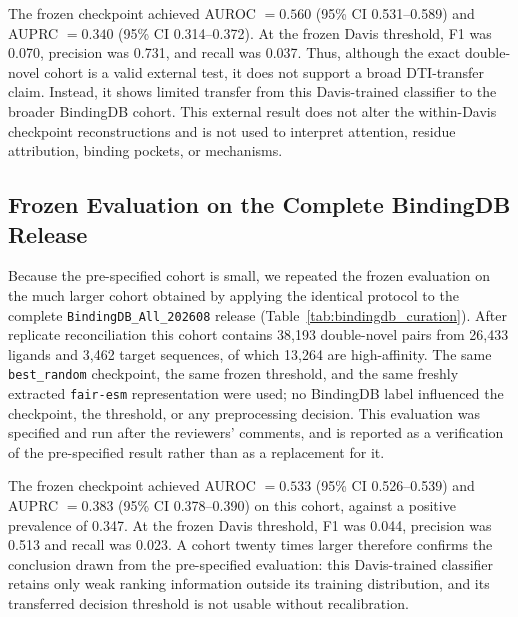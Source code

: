 \documentclass[fleqn,10pt]{wlscirep}
\begin{document}
The frozen checkpoint achieved AUROC $=0.560$ (95\% CI 0.531--0.589) and
AUPRC $=0.340$ (95\% CI 0.314--0.372).  At the frozen Davis threshold, F1 was
0.070, precision was 0.731, and recall was 0.037.  Thus, although the exact
double-novel cohort is a valid external test, it does not support a broad DTI-transfer claim.
Instead, it shows limited transfer from this
Davis-trained classifier to the broader BindingDB cohort.  This external result
does not alter the within-Davis checkpoint reconstructions and is not used to
interpret attention, residue attribution, binding pockets, or mechanisms.

\subsection{Frozen Evaluation on the Complete BindingDB Release}
\label{sec:bindingdb_full}

Because the pre-specified cohort is small, we repeated the frozen evaluation on
the much larger cohort obtained by applying the identical protocol to the
complete \texttt{BindingDB\_All\_202608} release
(Table~\ref{tab:bindingdb_curation}).  After replicate reconciliation this
cohort contains 38{,}193 double-novel pairs from 26{,}433 ligands and 3{,}462
target sequences, of which 13{,}264 are high-affinity.  The same
\texttt{best\_random} checkpoint, the same frozen threshold, and the same
freshly extracted \texttt{fair-esm} representation were used; no BindingDB label
influenced the checkpoint, the threshold, or any preprocessing decision.  This
evaluation was specified and run after the reviewers' comments, and is reported
as a verification of the pre-specified result rather than as a replacement
for it.

The frozen checkpoint achieved AUROC $=0.533$ (95\% CI 0.526--0.539) and AUPRC $=0.383$ (95\% CI 0.378--0.390) on this cohort, against a positive prevalence of 0.347.  At the frozen Davis threshold, F1 was 0.044, precision was 0.513 and recall was 0.023.  A cohort twenty times larger therefore confirms the conclusion drawn from the pre-specified evaluation: this Davis-trained classifier retains only weak ranking information outside its training distribution, and its transferred decision threshold is not usable without recalibration.
\end{document}

